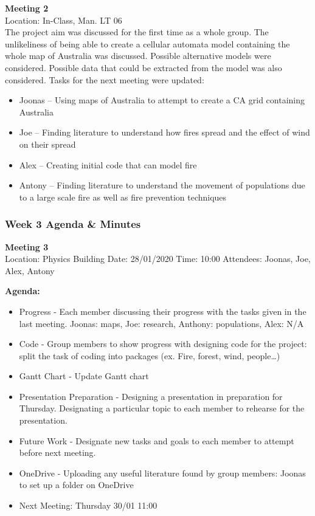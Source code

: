 \noindent \textbf{Meeting 2}\\
Location: In-Class, Man. LT 06\\
\noindent The project aim was discussed for the first time as a whole group. The unlikeliness of being able to create a cellular automata model containing the whole map of Australia was discussed. Possible alternative models were considered. Possible data that could be extracted from the model was also considered.  Tasks for the next meeting were updated: 

\begin{itemize}
    \item Joonas – Using maps of Australia to attempt to create a CA grid containing Australia 
    \item Joe – Finding literature to understand how fires spread and the effect of wind on their spread
    \item Alex – Creating initial code that can model fire 
    \item Antony – Finding literature to understand the movement of populations due to a large scale fire as well as fire prevention techniques
\end{itemize}

\subsubsection*{Week 3 Agenda \& Minutes}

\noindent \textbf{Meeting 3}\\
Location: Physics Building\newline
Date: 28/01/2020\newline
Time: 10:00\newline
Attendees: Joonas, Joe, Alex, Antony

\noindent \textbf{Agenda:}

\begin{itemize}
    \item Progress - Each member discussing their progress with the tasks given in the last meeting. Joonas: maps, Joe: research, Anthony: populations, Alex: N/A 
	\item Code - Group members to show progress with designing code for the project: split the task of coding into packages (ex. Fire, forest, wind, people…) 
	\item Gantt Chart - Update Gantt chart 
	\item Presentation Preparation - Designing a presentation in preparation for Thursday. Designating a particular topic to each member to rehearse for the presentation. 
	\item Future Work - Designate new tasks and goals to each member to attempt before next meeting. 
	\item OneDrive - Uploading any useful literature found by group members: Joonas to set up a folder on OneDrive 
	\item Next Meeting: Thursday 30/01 11:00
\end{itemize}

